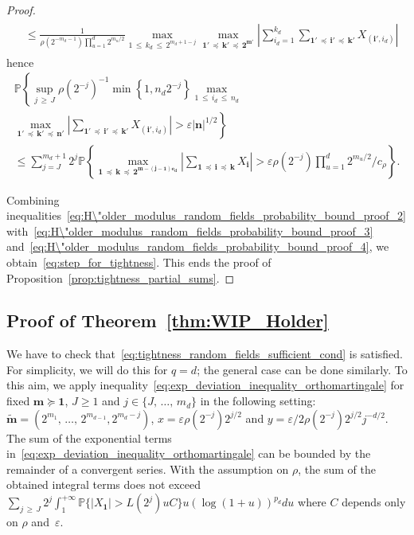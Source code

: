 \documentclass[AHL,Unicode,longabstracts,published]{cedram}
\newcommand\PP{\mathbb{P}}
\newcommand\ens[1]{\{ #1\}}
\newcommand\abs[1]{|#1|}
\newcommand{\pr}[1]{(#1)}
\newcommand\eps{\varepsilon}
\newcommand{\gr}[1]{\bm{#1}}
\newcommand{\gri}{\bm{i}}
\newcommand{\grn}{\bm{n}}
\newcommand{\grk}{\bm{k}}
\newcommand{\imd}{\preccurlyeq}
\newcommand{\smd}{\succcurlyeq }
\begin{document}
\begin{proof}
\begin{multline*}
\begin{aligned}
&\leq
\frac{1}{\rho\left(2^{-m_{d}-1}\right)\prod_{u=1}^d2^{m_u/2}}
\max_{1\,\leq\,k_d\,\leq\,2^{m_d+1-j}} \max_{\gr{1'}\,\imd\,\gr{k'}\,\imd\,
\gr{2^{m'}}}\left|\sum_{i_d=1}^{k_d}\sum_{\gr{1'}\,\imd\,\gr{i'}\,\imd\,\gr{k'}} X_{\left(\gr{i'},i_d\right)}\right|
\end{aligned}
\end{multline*}
hence
\begin{multline}\label{eq:H\"older_modulus_random_fields_probability_bound_proof_4}
\PP\left\{\sup_{j\,\geqslant\,J}\rho\left(2^{-j}\right)^{-1}
\min\left\{1,n_d2^{-j}\right\}\max_{1\,\leq\,i_d\,\leq \,n_d}\right.\\
\left.\max_{\gr{1'}\,\imd\,\gr{k'}\,\imd\,\gr{n'}} \left|
\sum_{\gr{1'}\,\imd\,\gr{i'}\,\imd\,\gr{k'}} X_{\left(\gr{i'},i_d\right) }\right|>\eps\abs{\grn}^{1/2}\right\}\\
\leq \sum_{j=J}^{m_d+1}2^j \PP\left\{
\max_{\gr{1}\,\imd\,\gr{k}\,\imd\,
\gr{2^{m-\pr{j-1}\gr{e_d}}}}\left|\sum_{\gr{1}\,\imd\,\gr{i}\,\imd\,\grk } X_{\gri}\right|> \eps\rho\left(2^{-j}\right)
\prod_{u=1}^d2^{m_u/2}/c_\rho\right\}.
\end{multline}

Combining inequalities~\eqref{eq:H\"older_modulus_random_fields_probability_bound_proof_2} with~\eqref{eq:H\"older_modulus_random_fields_probability_bound_proof_3} and~\eqref{eq:H\"older_modulus_random_fields_probability_bound_proof_4}, we obtain~\eqref{eq:step_for_tightness}. This ends the proof of Proposition~\ref{prop:tightness_partial_sums}.
\end{proof}

\subsection{Proof of Theorem~\ref{thm:WIP_Holder}}

We have to check that~\eqref{eq:tightness_random_fields_sufficient_cond} is satisfied. For simplicity, we will do this for $q=d$; the general case can be done similarly. To this aim, we apply inequality~\eqref{eq:exp_deviation_inequality_orthomartingale} for fixed $\gr{m}\smd\gr{1}$, $J\geq 1$ and $j\in\ens{J,\,\dots,\,m_d}$ in the following setting: $\widetilde{\gr{m}}=\pr{2^{m_1},\,\dots,\,2^{m_{d-1}},2^{m_d-j}}$, $x=\eps \rho\pr{2^{-j}}2^{j/2}$ and $y= \eps/2\rho\pr{2^{-j}}2^{j/2} j^{-d/2}$. The sum of the exponential terms in~\eqref{eq:exp_deviation_inequality_orthomartingale} can be bounded by the remainder of a convergent series. With the assumption on $\rho$, the sum of the obtained integral terms does not exceed $\sum_{j\,\geq\,J}2^j\int_1^{+\infty}\PP\ens{\abs{X_{\gr{1}}}>L\pr{2^j}uC} u\pr{\log\pr{1+u}}^{p_d}du$ where $C$ depends only on $\rho$ and~$\eps$.
\end{document}
